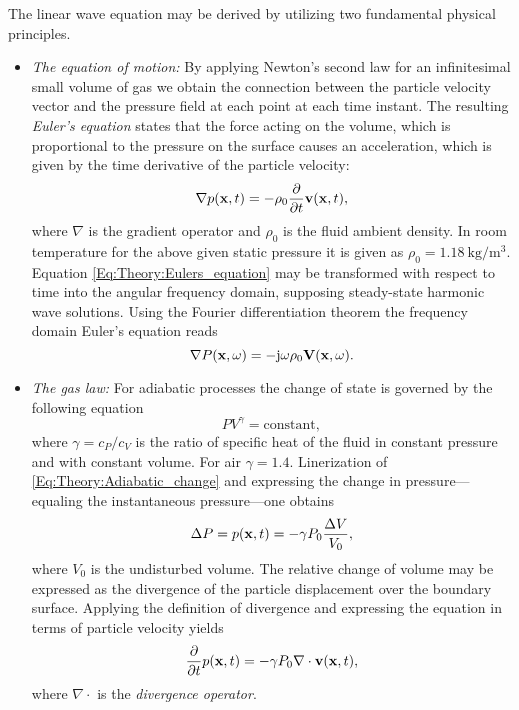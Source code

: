 The linear wave equation may be derived by utilizing two fundamental physical principles.
\begin{itemize}
\item \emph{The equation of motion:} By applying Newton's second law for an infinitesimal small volume of gas we obtain the connection between the particle velocity vector and the pressure field at each point at each time instant. The resulting \emph{Euler's equation} states that the force acting on the volume, which is proportional to the pressure on the surface causes an acceleration, which is given by the time derivative of the particle velocity:
\begin{equation}
\nabla p(\mathbf{x},t) = -\rho_0 \frac{\partial}{\partial t} \mathbf{v}(\mathbf{x},t),
\label{Eq:Theory:Eulers_equation}
\end{equation}
where $\nabla$ is the gradient operator and $\rho_0$ is the fluid ambient density. In room temperature for the above given static pressure it is given as $\rho_0 = 1.18~\mathrm{kg}/\mathrm{m}^3$.
Equation \eqref{Eq:Theory:Eulers_equation} may be transformed with respect to time into the angular frequency domain, supposing steady-state harmonic wave solutions. Using the Fourier differentiation theorem the frequency domain Euler's equation reads
\begin{equation}
\nabla P(\mathbf{x},\omega) = -\mathrm{j} \omega \rho_0 \mathbf{V}(\mathbf{x},\omega).
\label{Eq:Theory:Freq_Eulers_equation}
\end{equation}

\item \emph{The gas law:} For adiabatic processes the change of state is governed by the following equation
\begin{equation}
P V^{\gamma} = \mathrm{constant},
\label{Eq:Theory:Adiabatic_change}
\end{equation}
where $\gamma = c_P/c_V$ is the ratio of specific heat of the fluid in constant pressure and with constant volume. For air $\gamma = 1.4$. Linerization of \eqref{Eq:Theory:Adiabatic_change} and expressing the change in pressure---equaling the instantaneous pressure---one obtains
\begin{equation}
\Delta P = p(\mathbf{x},t) = -\gamma P_0 \frac{\Delta V}{V_0},
\end{equation}
where $V_0$ is the undisturbed volume. The relative change of volume may be expressed as the divergence of the particle displacement over the boundary surface. Applying the definition of divergence and expressing the equation in terms of particle velocity yields
\begin{equation}
\frac{\partial}{\partial t} p(\mathbf{x},t) = -\gamma P_0 \nabla \cdot \mathbf{v}(\mathbf{x},t),
\label{Eq:Theory:Second_eq}
\end{equation}
where $\nabla \cdot$ is the \emph{divergence operator}.
\end{itemize}

